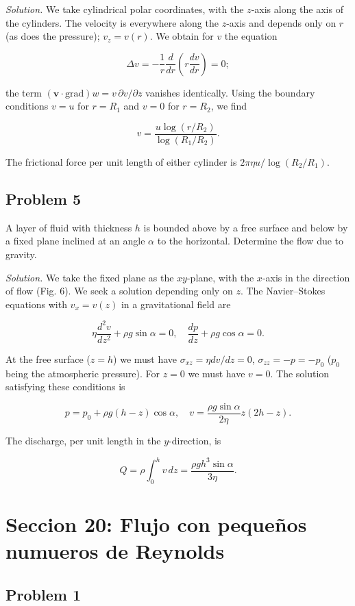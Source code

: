 \documentclass{article}
\begin{document}
\textit{Solution.} We take cylindrical polar coordinates, with the $z$-axis along the axis of the cylinders. The velocity is everywhere along the $z$-axis and depends only on $r$ (as does the pressure); $v_z = v(r)$. We obtain for $v$ the equation

$$
\Delta v = -\frac{1}{r} \frac{d}{dr} \left( r \frac{dv}{dr} \right) = 0;
$$

the term $(\mathbf{v} \cdot \text{grad})w = v \, \partial v/\partial z$ vanishes identically. Using the boundary conditions $v = u$ for $r = R_1$ and $v = 0$ for $r = R_2$, we find

$$
v = \frac{u \log(r/R_2)}{\log(R_1/R_2)}.
$$

The frictional force per unit length of either cylinder is $2\pi \eta u/\log(R_2/R_1)$.

\subsection*{Problem 5}

A layer of fluid with thickness $h$ is bounded above by a free surface and below by a fixed plane inclined at an angle $\alpha$ to the horizontal. Determine the flow due to gravity.

\textit{Solution.} We take the fixed plane as the $xy$-plane, with the $x$-axis in the direction of flow (Fig. 6). We seek a solution depending only on $z$. The Navier–Stokes equations with $v_x = v(z)$ in a gravitational field are

$$
\eta \frac{d^2 v}{dz^2} + \rho g \sin \alpha = 0, \quad \frac{dp}{dz} + \rho g \cos \alpha = 0.
$$

At the free surface ($z = h$) we must have $\sigma_{xz} = \eta dv/dz = 0$, $\sigma_{zz} = -p = -p_0$ ($p_0$ being the atmospheric pressure). For $z = 0$ we must have $v = 0$. The solution satisfying these conditions is

$$
p = p_0 + \rho g (h - z) \cos \alpha, \quad v = \frac{\rho g \sin \alpha}{2\eta} z(2h - z).
$$

The discharge, per unit length in the $y$-direction, is

$$
Q = \rho \int_0^h v \, dz = \frac{\rho g h^3 \sin \alpha}{3\eta}.
$$

\section*{Seccion 20: Flujo con pequeños numueros de Reynolds}

\subsection*{Problem 1}
\end{document}
